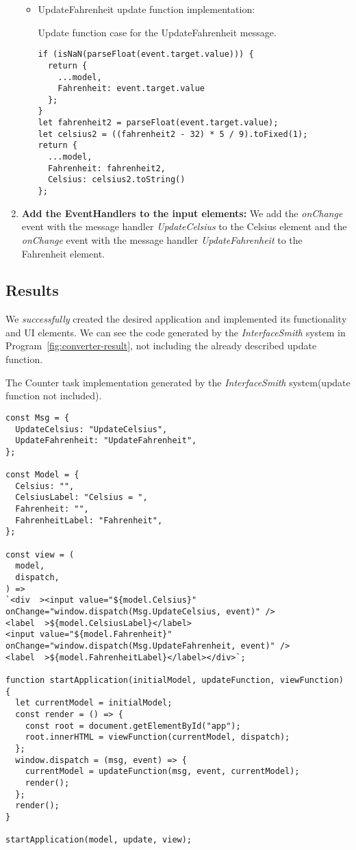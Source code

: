 \begin{enumerate}
\begin{itemize}
		      \item UpdateFahrenheit update function implementation:
		            \begin{listing}[htbp]
			            \caption{Update function case for the UpdateFahrenheit message.}

			            \begin{lstlisting}
if (isNaN(parseFloat(event.target.value))) {
  return {
    ...model,
    Fahrenheit: event.target.value
  };
}
let fahrenheit2 = parseFloat(event.target.value);
let celsius2 = ((fahrenheit2 - 32) * 5 / 9).toFixed(1);
return {
  ...model,
  Fahrenheit: fahrenheit2,
  Celsius: celsius2.toString()
};            \end{lstlisting}

		            \end{listing}
	      \end{itemize}

	\item \textbf{Add the EventHandlers to the input elements:} We add the \emph{onChange} event with the message handler \emph{UpdateCelsius} to the Celsius element and the \emph{onChange} event with the message handler \emph{UpdateFahrenheit} to the Fahrenheit element.
\end{enumerate}
\medskip
\subsection{Results}
We \emph{successfully} created the desired application and implemented its functionality and UI elements.
We can see the code generated by the \emph{InterfaceSmith} system in Program~\ref{fig:converter-result}, not including the already described update function.

\begin{listing}[p]
	\caption {The Counter task implementation generated by the \emph{InterfaceSmith} system(update function not included).}
	\label{fig:converter-result}
	\begin{lstlisting}
const Msg = {
  UpdateCelsius: "UpdateCelsius",
  UpdateFahrenheit: "UpdateFahrenheit",
};

const Model = {
  Celsius: "",
  CelsiusLabel: "Celsius = ",
  Fahrenheit: "",
  FahrenheitLabel: "Fahrenheit",
};

const view = (
  model,
  dispatch,
) =>
`<div  ><input value="${model.Celsius}" onChange="window.dispatch(Msg.UpdateCelsius, event)" />
<label  >${model.CelsiusLabel}</label>
<input value="${model.Fahrenheit}" onChange="window.dispatch(Msg.UpdateFahrenheit, event)" />
<label  >${model.FahrenheitLabel}</label></div>`;

function startApplication(initialModel, updateFunction, viewFunction) {
  let currentModel = initialModel;
  const render = () => {
    const root = document.getElementById("app");
    root.innerHTML = viewFunction(currentModel, dispatch);
  };
  window.dispatch = (msg, event) => {
    currentModel = updateFunction(msg, event, currentModel);
    render();
  };
  render();
}

startApplication(model, update, view);
\end{lstlisting}
\end{listing}


